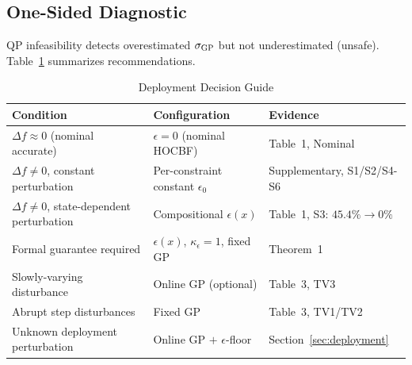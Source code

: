 \subsection{One-Sided Diagnostic}

QP infeasibility detects overestimated $\sigma_{\mathrm{GP}}$ but not underestimated (unsafe). Table~\ref{tab:deployment_guide} summarizes recommendations.

\begin{table}[htbp]
    \centering
    \caption{Deployment Decision Guide}
    \label{tab:deployment_guide}
    \footnotesize
    \begin{tabular}{p{} p{} p{}}
        \toprule
        \textbf{Condition} & \textbf{Configuration} & \textbf{Evidence} \\
        \midrule
        $\Delta f \approx 0$ (nominal accurate) & $\epsilon = 0$ (nominal HOCBF) & Table~1, Nominal \\
        $\Delta f \neq 0$, constant perturbation & Per-constraint constant $\epsilon_0$ & Supplementary, S1/S2/S4-S6 \\
        $\Delta f \neq 0$, state-dependent perturbation & Compositional $\epsilon(x)$ & Table~1, S3: $45.4\%\to0\%$ \\
        Formal guarantee required & $\epsilon(x)$, $\kappa_\epsilon{=}1$, fixed GP & Theorem~1 \\
        Slowly-varying disturbance & Online GP (optional) & Table~3, TV3 \\
        Abrupt step disturbances & Fixed GP & Table~3, TV1/TV2 \\
        Unknown deployment perturbation & Online GP $+$ $\epsilon$-floor & Section~\ref{sec:deployment} \\
        \bottomrule
    \end{tabular}
\end{table}
